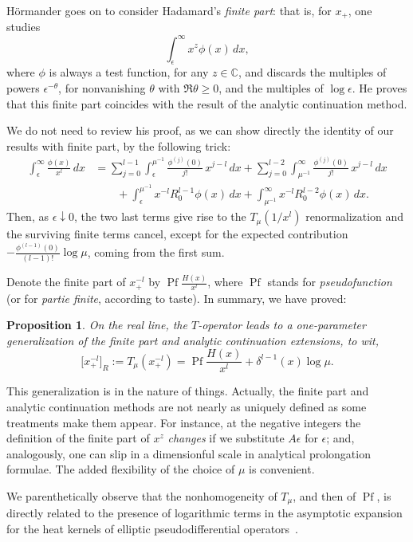 \documentclass[a4paper,12pt]{article}
\newcommand{\C}{\mathbb{C}}        %
\newcommand{\dl}{\delta}           %
\newcommand{\eps}{\epsilon}        %
\DeclareMathOperator{\Pf}{Pf}      %
\newcommand{\7}{\dagger}           %
\theoremstyle{plain}
\newtheorem{prop}[thm]{Proposition} %
\theoremstyle{definition}
\begin{document}
H\"ormander goes on to consider Hadamard's \textit{finite part}: that
is, for $x_+$, one studies
$$
\int_\eps^\infty x^z \phi(x)\,dx,
$$
where $\phi$ is always a test function, for any $z \in \C$, and
discards the multiples of powers $\eps^{-\theta}$, for nonvanishing
$\theta$ with $\Re\theta \geq 0$, and the multiples of $\log\eps$.
He proves that this finite part coincides with the result of the
analytic continuation method.

We do not need to review his proof, as we can show directly the
identity of our results with finite part, by the following trick:
\begin{align*}
\int_\eps^\infty \frac{\phi(x)}{x^l} \,dx
&= \sum_{j=0}^{l-1} \int_\eps^{\mu^{-1}} \frac{\phi^{(j)}(0)}{j!}
    \,x^{j-l}\,dx + \sum_{j=0}^{l-2} \int_{\mu^{-1}}^\infty
    \frac{\phi^{(j)}(0)}{j!} \,x^{j-l}\,dx
\\
&\qquad + \int_\eps^{\mu^{-1}} x^{-l} R^{l-1}_0\phi(x) \,dx
         + \int_{\mu^{-1}}^\infty x^{-l} R^{l-2}_0\phi(x) \,dx.
\end{align*}
Then, as $\eps \downarrow 0$, the two last terms give rise to the
$T_\mu(1/x^l)$ renormalization and the surviving finite terms cancel,
except for the expected contribution
$-\frac{\phi^{(l-1)}(0)}{(l-1)!} \log\mu$, coming from the first sum.

Denote the finite part of $x_+^{-l}$ by $\Pf \frac{H(x)}{x^l}$, where
$\Pf$ stands for \textit{pseudofunction} (or for \textit{partie
finite}, according to taste). In summary, we have proved:

\begin{prop}
On the real line, the $T$-operator leads to a one-parameter
generalization of the finite part and analytic continuation
extensions, to wit,
$$
\bigl[x_+^{-l}\bigr]_R := T_\mu(x_+^{-l}) =
\Pf \frac{H(x)}{x^l} + \dl^{l-1}(x) \log\mu.
$$
\end{prop}

This generalization is in the nature of things. Actually, the finite
part and analytic continuation methods are not nearly as uniquely
defined as some treatments make them appear. For instance, at the
negative integers the definition of the finite part of $x^z$
\textit{changes} if we substitute $A\eps$ for $\eps$; and,
analogously, one can slip in a dimensionful scale in analytical
prolongation formulae. The added flexibility of the choice of $\mu$ is
convenient.

We parenthetically observe that the nonhomogeneity of $T_\mu$, and
then of $\Pf$, is directly related to the presence of logarithmic
terms in the asymptotic expansion for the heat kernels of elliptic
pseudodifferential operators~\cite{Odysseus}.
\end{document}
